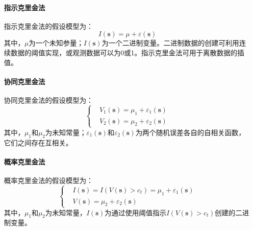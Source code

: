 \paragraph{指示克里金法}
指示克里金法的假设模型为：
\begin{equation}
    I\left( \mathbf{s} \right) = \mu + \varepsilon\left( \mathbf{s} \right)
\end{equation}
其中，$ \mu $为一个未知参量；$ I\left( \mathbf{s} \right) $为一个二进制变量。二进制数据的创建可利用连续数据的阈值实现，或观测数据可以为0或1。指示克里金法可用于离散数据的插值。
\paragraph{协同克里金法}
协同克里金法的假设模型为：
\begin{equation}
    \left\{
    \begin{aligned}
         & V_{1}\left( \mathbf{s} \right) = \mu_{1} + \varepsilon_{1}\left( \mathbf{s} \right) \\
         & V_{2}\left( \mathbf{s} \right) = \mu_{2} + \varepsilon_{2}\left( \mathbf{s} \right)
    \end{aligned}
    \right.
\end{equation}
其中，$ \mu_{1} $和$ \mu_{2} $为未知常量；$ \varepsilon_{1}\left( \mathbf{s} \right) $和$ \varepsilon_{2}\left( \mathbf{s} \right) $为两个随机误差各自的自相关函数，它们之间存在互相关。
\paragraph{概率克里金法}
概率克里金法的假设模型为：
\begin{equation}
    \left\{
    \begin{aligned}
         & I\left( \mathbf{s} \right) = I\left( V\left( \mathbf{s} \right) > c_{t} \right) = \mu_{1} + \varepsilon_{1}\left( \mathbf{s} \right) \\
         & V\left( \mathbf{s} \right) = \mu_{2} + \varepsilon_{2}\left( \mathbf{s} \right)
    \end{aligned}
    \right.
\end{equation}
其中，$ \mu_{1} $和$ \mu_{2} $为未知常量，$ I\left( \mathbf{s} \right) $为通过使用阈值指示$ I\left( V\left( \mathbf{s} \right) > c_{t} \right) $创建的二进制变量。